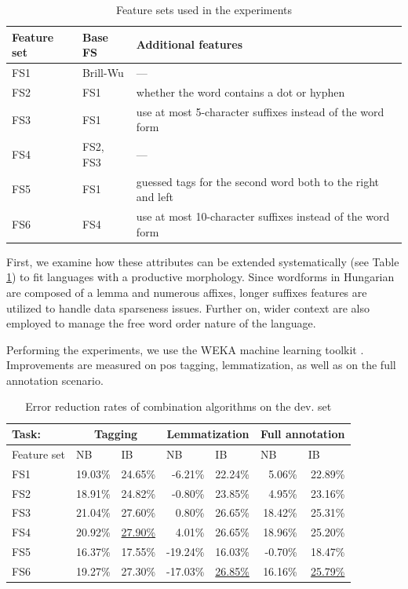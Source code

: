 \begin{table}[H]
\centering
\caption{Feature sets used in the experiments}\label{tab:comb-feature-sets}
\begin{tabular}{l l l}
\hline
Feature set & Base FS & Additional features \\
\hline
FS1 & Brill-Wu & --- \\
FS2 & FS1 & whether the word contains a dot or hyphen \\
FS3 & FS1 & use at most 5-character suffixes instead of the word form \\
FS4 & FS2, FS3 & --- \\ 
FS5 & FS1 & guessed tags for the second word both to the right and left \\
FS6 & FS4 & use at most 10-character suffixes instead of the word form \\
\hline
\end{tabular}
\end{table}

First, we examine how these attributes can be extended systematically (see Table \ref{tab:comb-feature-sets}) to fit languages with a productive morphology.
Since wordforms in Hungarian are composed of a lemma and numerous affixes, longer suffixes features are utilized to handle data sparseness issues.
Further on, wider context are also employed to manage the free word order nature of the language. 


Performing the experiments, we use the WEKA machine learning toolkit \cite{Hall2009}.
Improvements are measured on \acrshort{pos} tagging, lemmatization, as well as on the full annotation scenario.

\begin{table}[H]
\centering
\caption{Error reduction rates of combination algorithms on the dev. set}\label{tab:comb-reduction-rates}
\begin{tabular}{l r r r r r r}
\hline
Task:& \multicolumn{2}{c}{Tagging} & \multicolumn{2}{c}{Lemmatization} & \multicolumn{2}{c}{Full annotation} \\
\hline
Feature set & \multicolumn{1}{l}{NB} & \multicolumn{1}{l}{IB} & \multicolumn{1}{l}{NB} & \multicolumn{1}{l}{IB} & \multicolumn{1}{l}{NB} & \multicolumn{1}{l}{IB} \\
\hline
FS1 & 19.03\% & 24.65\% & -6.21\% & 22.24\% & 5.06\% & 22.89\% \\
FS2 & 18.91\% & 24.82\% & -0.80\% & 23.85\% & 4.95\% & 23.16\% \\
FS3 & 21.04\% & 27.60\% & 0.80\% & 26.65\% & 18.42\% & 25.31\% \\
FS4 & 20.92\% & \underline{27.90\%} & 4.01\% & 26.65\% & 18.96\% & 25.20\% \\
FS5 & 16.37\% & 17.55\% & -19.24\% & 16.03\% & -0.70\% & 18.47\% \\
FS6 & 19.27\% & 27.30\% & -17.03\% & \underline{26.85\%} & 16.16\% & \underline{25.79\%} \\
\hline
\end{tabular}
\end{table}


